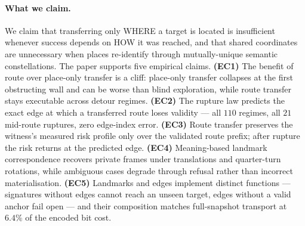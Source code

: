 \documentclass{article}
\begin{document}
\paragraph{What we claim.} We claim that transferring only WHERE a
target is located is insufficient whenever success depends on HOW it
was reached, and that shared coordinates are unnecessary when places
re-identify through mutually-unique semantic constellations. The
paper supports five empirical claims. \textbf{(EC1)} The benefit of
route over place-only transfer is a cliff: place-only transfer
collapses at the first obstructing wall and can be worse than blind
exploration, while route transfer stays executable across detour
regimes. \textbf{(EC2)} The rupture law predicts the exact edge at
which a transferred route loses validity --- all $110$ regimes, all
$21$ mid-route ruptures, zero edge-index error. \textbf{(EC3)} Route
transfer preserves the witness's measured risk profile only over the
validated route prefix; after rupture the risk returns at the
predicted edge. \textbf{(EC4)} Meaning-based landmark correspondence
recovers private frames under translations and quarter-turn
rotations, while ambiguous cases degrade through refusal rather than
incorrect materialisation. \textbf{(EC5)} Landmarks and edges
implement distinct functions --- signatures without edges cannot
reach an unseen target, edges without a valid anchor fail open ---
and their composition matches full-snapshot transport at $6.4\%$ of
the encoded bit cost.
\end{document}
